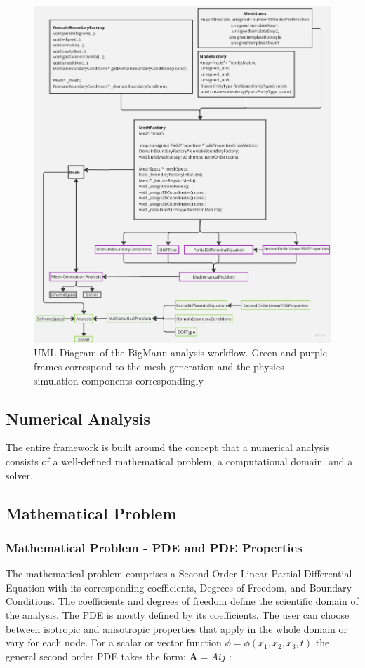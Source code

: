 \documentclass{article}
\begin{document}
	\begin{figure}[H]

		\includegraphics[height=1.0\textheight, width=1.05\textwidth, keepaspectratio]{./images/uml.jpg}
		\caption{UML Diagram of the BigMann analysis workflow. Green and purple frames correspond to the mesh generation and the physics simulation components correspondingly}
		\label{fig:UML}
	\end{figure}
	
	\newpage
	
	\subsection {Numerical Analysis}
	
	The entire framework is built around the concept that a numerical analysis consists of a well-defined mathematical problem, a computational domain, and a solver.

	\subsection{Mathematical Problem}
	
	\subsubsection{Mathematical Problem - PDE and PDE Properties}
	The mathematical problem comprises a Second Order Linear Partial Differential Equation with its corresponding coefficients, Degrees of Freedom, and Boundary Conditions. The coefficients and degrees of freedom define the scientific domain of the analysis. The PDE is mostly defined by its coefficients. The user can choose between isotropic and anisotropic properties that apply in the whole domain or vary for each node. For a scalar or vector function $\phi = \phi(x_1, x_2, x_3,t)$ the general second order PDE takes the form:	$\boldsymbol{A} = Aij$ : 
	
\end{document}
